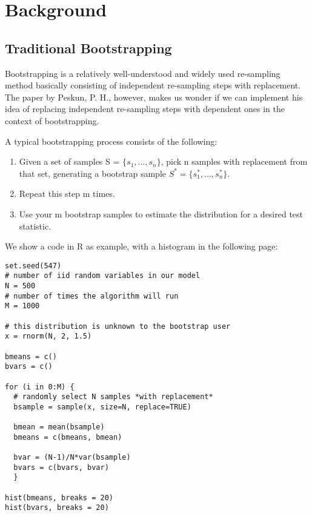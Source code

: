

\section{Background}

\subsection{Traditional Bootstrapping}
Bootstrapping is a relatively well-understood and widely used re-sampling method basically consisting of independent re-sampling steps with replacement. The paper by Peskun, P. H., however, makes us wonder if we can implement his idea of replacing independent re-sampling steps with dependent ones in the context of bootstrapping.

A typical bootstrapping process consists of the following:

\begin{enumerate}[label=\alph*)]
\item Given a set of samples S = $\{s_1, ..., s_n\}$, pick n samples with replacement from that set, generating a bootstrap sample $S^* = \{s^*_1, ..., s^*_n\}$.

\item Repeat this step m times.

\item Use your m bootstrap samples to estimate the distribution for a desired test statistic.
\end{enumerate}

We show a code in R as example, with a histogram in the following page:


\begin{lstlisting}
set.seed(547)
# number of iid random variables in our model
N = 500
# number of times the algorithm will run 
M = 1000 

# this distribution is unknown to the bootstrap user
x = rnorm(N, 2, 1.5)

bmeans = c()
bvars = c()

for (i in 0:M) {
  # randomly select N samples *with replacement* 
  bsample = sample(x, size=N, replace=TRUE) 
  
  bmean = mean(bsample)
  bmeans = c(bmeans, bmean)
  
  bvar = (N-1)/N*var(bsample)
  bvars = c(bvars, bvar)
  }

hist(bmeans, breaks = 20)
hist(bvars, breaks = 20)
\end{lstlisting}

